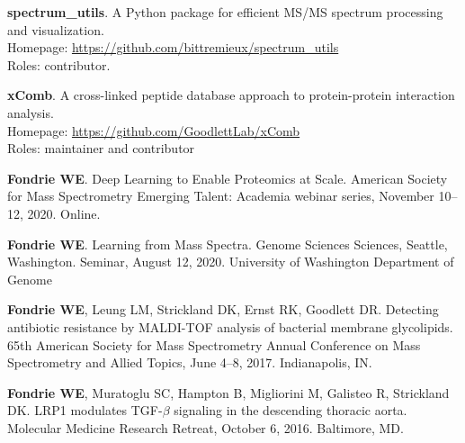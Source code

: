 \documentclass[11pt]{article}
\newcommand{\mysection}[1]{\vspace{1ex \textbf{\large \textrm{#1}} \quad
    \hrulefill}}
\newcommand{\myref}[1]{\href{#1}{\url{#1}}}
\begin{document}
\begin{etaremune}
  \item \textbf{spectrum\_utils}. A Python package for efficient MS/MS spectrum
  processing and visualization. \\
  Homepage: \myref{https://github.com/bittremieux/spectrum_utils} \\
  Roles: contributor.

  \item \textbf{xComb}. A cross-linked peptide database approach to
  protein-protein interaction analysis. \\
  Homepage: \myref{https://github.com/GoodlettLab/xComb} \\
  Roles: maintainer and contributor

\end{etaremune}

\mysection{Talks}
\begin{etaremune}
  \item \textbf{Fondrie WE}. Deep Learning to Enable Proteomics at Scale.
  American Society for Mass Spectrometry Emerging Talent: Academia webinar
  series, November 10--12, 2020. Online.
  
  \item \textbf{Fondrie WE}. Learning from Mass Spectra. Genome Sciences
  Sciences, Seattle, Washington. Seminar, August 12, 2020. University of
  Washington Department of Genome
  
  \item \textbf{Fondrie WE}, Leung LM, Strickland DK, Ernst RK, Goodlett DR.
  Detecting antibiotic resistance by MALDI-TOF analysis of bacterial membrane
  glycolipids. 65th American Society for Mass Spectrometry Annual Conference on
  Mass Spectrometry and Allied Topics, June 4--8, 2017. Indianapolis, IN.
    
  \item \textbf{Fondrie WE}, Muratoglu SC, Hampton B, Migliorini M, Galisteo R,
  Strickland DK. LRP1 modulates TGF-$\beta$ signaling in the descending
  thoracic aorta. Molecular Medicine Research Retreat, October 6, 2016.
  Baltimore, MD.
\end{etaremune}
\end{document}
